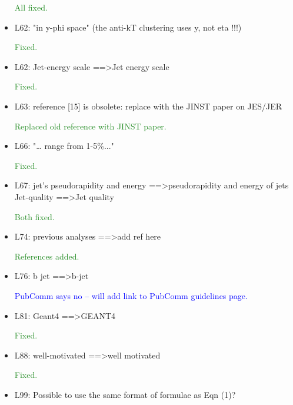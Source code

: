 \documentclass[paper=a4, fontsize=11pt]{scrartcl}
\begin{document}
\begin{itemize}
\textcolor{ForestGreen}{All fixed.}\\

\item L62: 
"in y-phi space" (the anti-kT clustering uses y, not eta !!!) 

\textcolor{ForestGreen}{Fixed.}\\

\item L62: 
Jet-energy scale ==\textgreater Jet energy scale 

\textcolor{ForestGreen}{Fixed.}\\

\item L63: 
reference [15] is obsolete: replace with the JINST paper on JES/JER 

\textcolor{ForestGreen}{Replaced old reference with JINST paper.}\\

\item L66: 
"… range from 1-5\%..." 

\textcolor{ForestGreen}{Fixed.}\\

\item L67: 
jet’s pseudorapidity and energy ==\textgreater pseudorapidity and energy of jets 
Jet-quality ==\textgreater Jet quality 

\textcolor{ForestGreen}{Both fixed.}\\

\item L74: 
previous analyses ==\textgreater add ref here 

\textcolor{ForestGreen}{References added.}\\

\item L76: 
b jet ==\textgreater b-jet 

\textcolor{Blue}{PubComm says no -- will add link to PubComm guidelines page.}\\

\item L81: 
Geant4 ==\textgreater GEANT4 

\textcolor{ForestGreen}{Fixed.}\\

\item L88: 
well-motivated ==\textgreater well motivated 

\textcolor{ForestGreen}{Fixed.}\\

\item L99: 
Possible to use the same format of formulae as Eqn (1)? 


\end{itemize}
\end{document}
